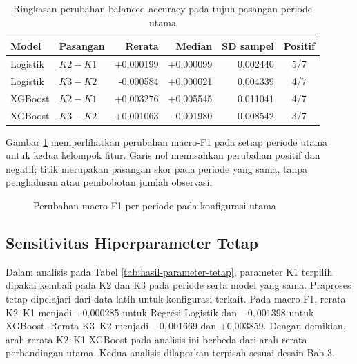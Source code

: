 \begin{table}[htbp]
\centering
\small
\setlength{\tabcolsep}{4pt}
\caption{Ringkasan perubahan balanced accuracy pada tujuh pasangan periode utama}
\label{tab:hasil-paired-ba}
\begin{tabular}{llrrrc}
\toprule
Model & Pasangan & Rerata & Median & SD sampel & Positif \\
\midrule
Logistik & $K2-K1$ & +0,000199 & +0,000099 & 0,002440 & 5/7 \\
Logistik & $K3-K2$ & -0,000584 & +0,000021 & 0,004339 & 4/7 \\
XGBoost & $K2-K1$ & +0,003276 & +0,005545 & 0,011041 & 4/7 \\
XGBoost & $K3-K2$ & +0,001063 & -0,001980 & 0,008542 & 3/7 \\
\bottomrule
\end{tabular}
\end{table}


Gambar \ref{fig:hasil-delta-periode} memperlihatkan perubahan macro-F1 pada setiap periode utama untuk kedua kelompok fitur. Garis nol memisahkan perubahan positif dan negatif; titik merupakan pasangan skor pada periode yang sama, tanpa penghalusan atau pembobotan jumlah observasi.

\begin{figure}[htbp]
\centering

\caption{Perubahan macro-F1 per periode pada konfigurasi utama}
\label{fig:hasil-delta-periode}
\end{figure}

\subsection{Sensitivitas Hiperparameter Tetap}

Dalam analisis pada Tabel \ref{tab:hasil-parameter-tetap}, parameter K1 terpilih dipakai kembali pada K2 dan K3 pada periode serta model yang sama. Praproses tetap dipelajari dari data latih untuk konfigurasi terkait. Pada macro-F1, rerata K2--K1 menjadi +0,000285 untuk Regresi Logistik dan $-0{,}001398$ untuk XGBoost. Rerata K3--K2 menjadi $-0{,}001669$ dan +0,003859. Dengan demikian, arah rerata K2--K1 XGBoost pada analisis ini berbeda dari arah rerata perbandingan utama. Kedua analisis dilaporkan terpisah sesuai desain Bab 3.


